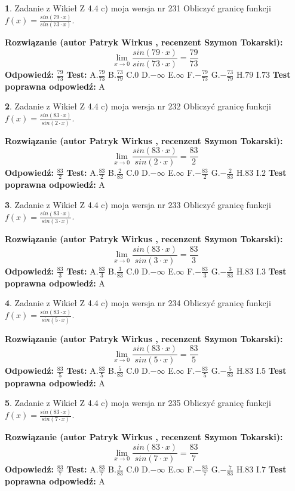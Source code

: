 \documentclass[12pt, a4paper]{article}
\theoremstyle{definition} %
\newtheorem{zad}{}
\newcommand{\zadStart}[1]{\begin{zad}#1\newline}
\newcommand{\zadStop}{\end{zad}}
\newcommand{\rozwStart}[2]{\noindent \textbf{Rozwiązanie (autor #1 , recenzent #2): }\newline}
\newcommand{\rozwStop}{\newline}
\newcommand{\odpStart}{\noindent \textbf{Odpowiedź:}\newline}
\newcommand{\odpStop}{\newline}
\newcommand{\testStart}{\noindent \textbf{Test:}\newline}
\newcommand{\testStop}{\newline}
\newcommand{\kluczStart}{\noindent \textbf{Test poprawna odpowiedź:}\newline}
\newcommand{\kluczStop}{\newline}
\begin{document}
\zadStart{Zadanie z Wikieł Z 4.4 c) moja wersja nr 231}
Obliczyć granicę funkcji $f(x)=\frac{sin(79\cdot x)}{sin(73\cdot x)}$.
\zadStop
\rozwStart{Patryk Wirkus}{Szymon Tokarski}
$$\lim\limits_{x\to 0}\frac{sin(79\cdot x)}{sin(73\cdot x)}=
\frac{79}{73}$$
\rozwStop
\odpStart
$\frac{79}{73}$
\odpStop
\testStart
A.$\frac{79}{73}$
B.$\frac{73}{79}$
C.$0$
D.$-\infty$
E.$\infty$
F.$-\frac{79}{73}$
G.$-\frac{73}{79}$
H.$79$
I.$73$
\testStop
\kluczStart
A
\kluczStop



\zadStart{Zadanie z Wikieł Z 4.4 c) moja wersja nr 232}
Obliczyć granicę funkcji $f(x)=\frac{sin(83\cdot x)}{sin(2\cdot x)}$.
\zadStop
\rozwStart{Patryk Wirkus}{Szymon Tokarski}
$$\lim\limits_{x\to 0}\frac{sin(83\cdot x)}{sin(2\cdot x)}=
\frac{83}{2}$$
\rozwStop
\odpStart
$\frac{83}{2}$
\odpStop
\testStart
A.$\frac{83}{2}$
B.$\frac{2}{83}$
C.$0$
D.$-\infty$
E.$\infty$
F.$-\frac{83}{2}$
G.$-\frac{2}{83}$
H.$83$
I.$2$
\testStop
\kluczStart
A
\kluczStop



\zadStart{Zadanie z Wikieł Z 4.4 c) moja wersja nr 233}
Obliczyć granicę funkcji $f(x)=\frac{sin(83\cdot x)}{sin(3\cdot x)}$.
\zadStop
\rozwStart{Patryk Wirkus}{Szymon Tokarski}
$$\lim\limits_{x\to 0}\frac{sin(83\cdot x)}{sin(3\cdot x)}=
\frac{83}{3}$$
\rozwStop
\odpStart
$\frac{83}{3}$
\odpStop
\testStart
A.$\frac{83}{3}$
B.$\frac{3}{83}$
C.$0$
D.$-\infty$
E.$\infty$
F.$-\frac{83}{3}$
G.$-\frac{3}{83}$
H.$83$
I.$3$
\testStop
\kluczStart
A
\kluczStop



\zadStart{Zadanie z Wikieł Z 4.4 c) moja wersja nr 234}
Obliczyć granicę funkcji $f(x)=\frac{sin(83\cdot x)}{sin(5\cdot x)}$.
\zadStop
\rozwStart{Patryk Wirkus}{Szymon Tokarski}
$$\lim\limits_{x\to 0}\frac{sin(83\cdot x)}{sin(5\cdot x)}=
\frac{83}{5}$$
\rozwStop
\odpStart
$\frac{83}{5}$
\odpStop
\testStart
A.$\frac{83}{5}$
B.$\frac{5}{83}$
C.$0$
D.$-\infty$
E.$\infty$
F.$-\frac{83}{5}$
G.$-\frac{5}{83}$
H.$83$
I.$5$
\testStop
\kluczStart
A
\kluczStop



\zadStart{Zadanie z Wikieł Z 4.4 c) moja wersja nr 235}
Obliczyć granicę funkcji $f(x)=\frac{sin(83\cdot x)}{sin(7\cdot x)}$.
\zadStop
\rozwStart{Patryk Wirkus}{Szymon Tokarski}
$$\lim\limits_{x\to 0}\frac{sin(83\cdot x)}{sin(7\cdot x)}=
\frac{83}{7}$$
\rozwStop
\odpStart
$\frac{83}{7}$
\odpStop
\testStart
A.$\frac{83}{7}$
B.$\frac{7}{83}$
C.$0$
D.$-\infty$
E.$\infty$
F.$-\frac{83}{7}$
G.$-\frac{7}{83}$
H.$83$
I.$7$
\testStop
\kluczStart
A
\kluczStop
\end{document}
